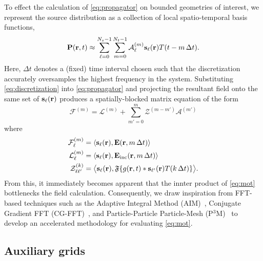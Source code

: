 To effect the calculation of \cref{eq:propagator} on bounded geometries of interest, we represent the source distribution as a collection of local spatio-temporal basis functions,
\begin{equation}
  \vb{P}(\vb{r}, t) \approx \sum_{\ell = 0}^{N_s - 1} \sum_{m = 0}^{N_t - 1} \mathcal{A}_\ell^{(m)} \vb{s}_\ell(\vb{r}) T(t - m \, \Delta t).
  \label{eq:discretization}
\end{equation}
Here, $\Delta t$ denotes a (fixed) time interval chosen such that the discretization accurately oversamples the highest frequency in the system.
Substituting \cref{eq:discretization} into \cref{eq:propagator} and projecting the resultant field onto the same set of $\vb{s}_\ell(\vb{r})$ produces a spatially-blocked matrix equation of the form
\begin{equation}
  \mathcal{F}^{(m)} = \mathcal{L}^{(m)} + \sum_{m'= 0}^m \mathcal{Z}^{(m - m')} \mathcal{A}^{(m')}
  \label{eq:mot}
\end{equation}
where
\begin{subequations}
  \begin{align}
    \mathcal{F}^{(m)}_\ell &= \langle \vb{s}_\ell(\vb{r}), \vb{E}(\vb{r}, m \, \Delta t) \rangle \label{eq:f elements}\\
    \mathcal{L}^{(m)}_\ell &= \langle \vb{s}_\ell(\vb{r}), \vb{E}_\text{inc}(\vb{r}, m \, \Delta t) \rangle \label{eq:l elements}\\
    \mathcal{Z}^{(k)}_{\ell\ell'} &= \big\langle \vb{s}_\ell(\vb{r}), \mathfrak{F}\qty{g(\vb{r}, t) \ast \vb{s}_{\ell'}(\vb{r}) T(k \, \Delta t)} \big\rangle \label{eq:z elements}.
  \end{align}
\end{subequations}
From this, it immediately becomes apparent that the innter product of \cref{eq:mot} bottlenecks the field calculation.
Consequently, we draw inspiration from FFT-based techniques such as the Adaptive Integral Method (AIM)~\cite{Bleszynski1996,Yilmaz2004}, Conjugate Gradient FFT (CG-FFT)~\cite{CG-FFT}, and Particle-Particle Particle-Mesh (P$^3$M)~\cite{p cubed m} to develop an accelerated methodology for evaluating \cref{eq:mot}.

\subsection{Auxiliary grids}

